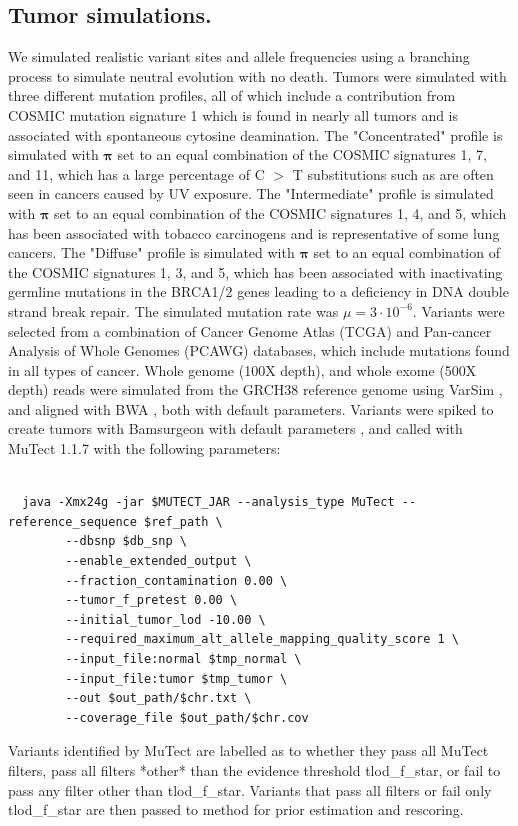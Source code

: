 \documentclass[a4,center,fleqn]{NAR}
\begin{document}
\subsection{Tumor simulations.}
We simulated realistic variant sites and allele frequencies using a branching process to simulate neutral evolution with no death.
Tumors were simulated with three different mutation profiles, all of which include a contribution from COSMIC mutation signature 1 which is found in nearly all tumors and is associated with spontaneous cytosine deamination.
The "Concentrated" profile is simulated with $\mathbf{\pi}$ set to an equal combination of the COSMIC signatures 1, 7, and 11, which has a large percentage of C $>$ T substitutions such as are often seen in cancers caused by UV exposure.
The "Intermediate" profile is simulated with $\mathbf{\pi}$ set to an equal combination of the COSMIC signatures 1, 4, and 5, which has been associated with tobacco carcinogens and is representative of some lung cancers.
The "Diffuse" profile is simulated with $\mathbf{\pi}$ set to an equal combination of the COSMIC signatures 1, 3, and 5, which has been associated with inactivating germline mutations in the BRCA1/2 genes leading to a deficiency in DNA double strand break repair.
The simulated mutation rate was $\mu = 3\cdot10^{-6}$.
Variants were selected from a combination of Cancer Genome Atlas (TCGA) and Pan-cancer Analysis of Whole Genomes (PCAWG) databases, which include mutations found in all types of cancer.
Whole genome (100X depth), and whole exome (500X depth) reads were simulated from the GRCH38 reference genome using VarSim \cite{Mu2015}, and aligned with BWA \cite{Li2009a}, both with default parameters.
Variants were spiked to create tumors with Bamsurgeon with default parameters \cite{Ewing2015a},
and called with MuTect 1.1.7 \cite{Cibulskis2013} with the following parameters:

\begin{tiny}
\begin{verbatim}

  java -Xmx24g -jar $MUTECT_JAR --analysis_type MuTect --reference_sequence $ref_path \
        --dbsnp $db_snp \
        --enable_extended_output \
        --fraction_contamination 0.00 \
        --tumor_f_pretest 0.00 \
        --initial_tumor_lod -10.00 \
        --required_maximum_alt_allele_mapping_quality_score 1 \
        --input_file:normal $tmp_normal \
        --input_file:tumor $tmp_tumor \
        --out $out_path/$chr.txt \
        --coverage_file $out_path/$chr.cov

\end{verbatim}
\end{tiny}
Variants identified by MuTect are labelled as to whether they pass all MuTect filters, pass all filters *other* than the evidence threshold \textrm{tlod\_f\_star}, or fail to pass any filter other than \textrm{tlod\_f\_star}. Variants that pass all filters or fail only \textrm{tlod\_f\_star} are then passed to {method} for prior estimation and rescoring.
\end{document}
